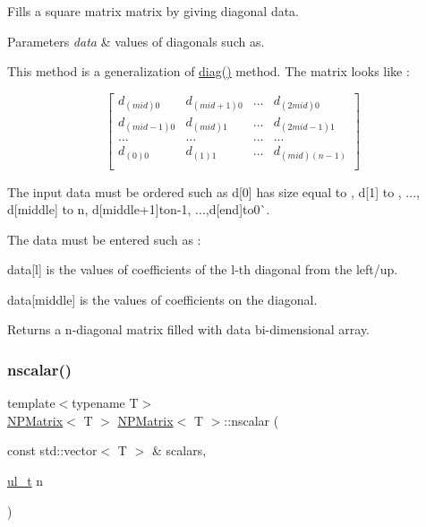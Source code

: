 Fills a square matrix matrix by giving diagonal data. 


\begin{DoxyParams}{Parameters}
{\em data} & values of diagonals such as.\\
\hline
\end{DoxyParams}
This method is a generalization of {\ttfamily \mbox{\hyperlink{class_n_p_matrix_ae73ef1ba99fe04c35af30adc3bfbd1dc}{diag()}}} method. The matrix looks like \+:

\[ \begin{bmatrix} d_{(mid)0} & d_{(mid+1)0} & ... & d_{(2 mid)0} \\ d_{(mid-1)0} & d_{(mid)1} & ... & d_{(2 mid-1)1} \\ ... & ... & ... & ...\\ d_{(0)0} & d_{(1)1} & ... & d_{(mid)(n-1)} \\ \end{bmatrix} \]

The input data must be ordered such as {\ttfamily d\mbox{[}0\mbox{]}} has size equal to {}, {\ttfamily d\mbox{[}1\mbox{]}} to {}, ..., {\ttfamily d\mbox{[}middle\mbox{]}} to {\ttfamily n}, d\mbox{[}middle+1\mbox{]}{\ttfamily to}n-\/1{\ttfamily , ...,}d\mbox{[}end\mbox{]}{\ttfamily to}0\`{}.

The data must be entered such as \+:


\begin{DoxyItemize}
\item {\ttfamily data\mbox{[}l\mbox{]}} is the values of coefficients of the l-\/th diagonal from the left/up.
\item {\ttfamily data\mbox{[}middle\mbox{]}} is the values of coefficients on the diagonal.
\end{DoxyItemize}

\begin{DoxyReturn}{Returns}
a n-\/diagonal matrix filled with data bi-\/dimensional array. 
\end{DoxyReturn}
\mbox{\label{class_n_p_matrix_aa2540f387990e3db6551bd88bc5d43d9}} 
\subsubsection{\texorpdfstring{nscalar()}{nscalar()}}
{\footnotesize\ttfamily template$<$typename T$>$ \\
\mbox{\hyperlink{class_n_p_matrix}{N\+P\+Matrix}}$<$ T $>$ \mbox{\hyperlink{class_n_p_matrix}{N\+P\+Matrix}}$<$ T $>$\+::nscalar (\begin{DoxyParamCaption}\item[{const std\+::vector$<$ T $>$ \&}]{scalars,  }\item[{\mbox{\hyperlink{typedef_8h_a1b140a2034db3f5dfe18a987745df43a}{ul\+\_\+t}}}]{n }\end{DoxyParamCaption})\hspace{0.3cm}{\ttfamily [static]}}



